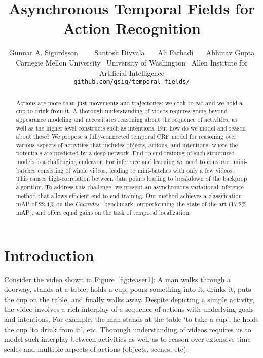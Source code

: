 \documentclass[10pt,twocolumn,letterpaper]{article}
\newcommand{\myurl}[1]{\texttt{#1}}
\begin{document}
\title{Asynchronous Temporal Fields for Action Recognition}

\renewcommand{\thefootnote}{\fnsymbol{footnote}}
\author{Gunnar A. Sigurdsson \ \ \ \ 
Santosh Divvala \ \ \ 
Ali Farhadi \ \ \ 
Abhinav Gupta \\
Carnegie Mellon University \ 
University of Washington \
Allen Institute for Artificial Intelligence \\
\myurl{github.com/gsig/temporal-fields/}
}
\thispagestyle{empty}
\maketitle
\thispagestyle{empty}
\begin{abstract}
Actions are more than just movements and trajectories: we cook to eat and we hold a cup to drink from it. A thorough understanding of videos requires going beyond appearance modeling and necessitates reasoning about the sequence of activities, as well as the higher-level constructs such as intentions. But how do we model and reason about these? We propose a fully-connected temporal CRF model for reasoning over various aspects of activities that includes objects, actions, and intentions, where the potentials are predicted by a deep network. 
End-to-end training of such structured models is a challenging endeavor: For inference and learning we need to construct mini-batches consisting of whole videos, leading to mini-batches with only a few videos. This causes high-correlation between data points leading to breakdown of the backprop algorithm.  
To address this challenge, we present an asynchronous variational inference method that allows efficient end-to-end training. Our method achieves a classification mAP of 22.4\% on the {\em Charades}~\cite{charades} benchmark, outperforming the state-of-the-art (17.2\% mAP), and offers equal gains on the task of temporal localization.
\end{abstract} 

\section{Introduction} 
\label{sec:intro}
\footnotetext{\footnotemark[1]Work was done while Gunnar was an intern at AI2.}

Consider the video shown in Figure~\ref{fig:teaser1}: A man walks through a doorway, stands at a table, holds a cup, pours something into it, drinks it, puts the cup on the table, and finally walks away. Despite depicting a simple activity, the video involves a rich interplay of a sequence of actions with underlying goals and intentions. For example, the man stands at the table `to take a cup', he holds the cup `to drink from it', etc. Thorough understanding of videos requires us to model such interplay between activities as well as to reason over extensive time scales and multiple aspects of actions (objects, scenes, etc). 
\end{document}
